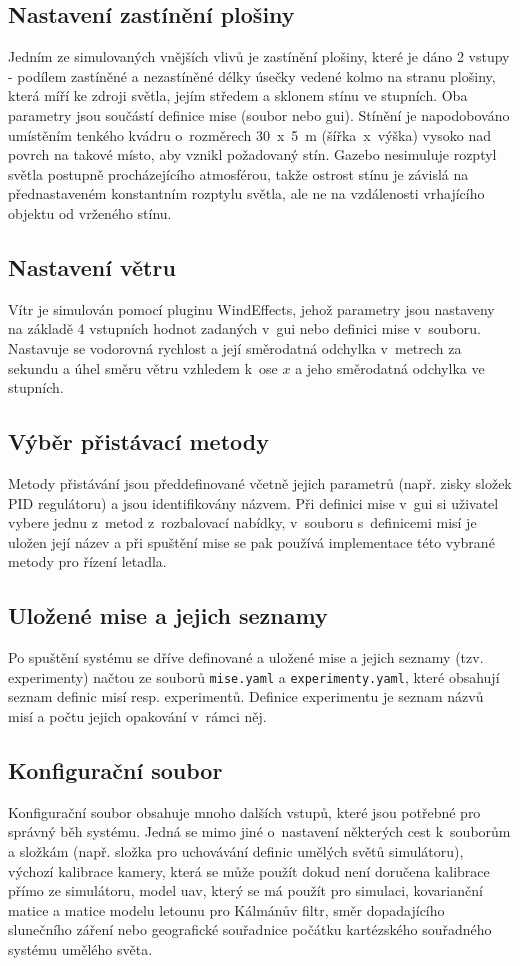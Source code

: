     \subsection{Nastavení zastínění plošiny}
      Jedním ze simulovaných vnějších vlivů je zastínění plošiny, které je dáno 2 vstupy - podílem zastíněné a nezastíněné délky úsečky vedené kolmo na stranu plošiny, která míří ke zdroji světla, jejím středem a sklonem stínu ve stupních. Oba parametry jsou součástí definice mise (soubor nebo \acrshort{gui}). Stínění je napodobováno umístěním tenkého kvádru o~rozměrech 30~x~5~m (šířka~x~výška) vysoko nad povrch na takové místo, aby vznikl požadovaný stín. Gazebo nesimuluje rozptyl světla postupně procházejícího atmosférou, takže ostrost stínu je závislá na přednastaveném konstantním rozptylu světla, ale ne na vzdálenosti vrhajícího objektu od vrženého stínu.
    \subsection{Nastavení větru}
      Vítr je simulován pomocí pluginu WindEffects, jehož parametry jsou nastaveny na základě 4 vstupních hodnot zadaných v~\acrshort{gui} nebo definici mise v~souboru. Nastavuje se vodorovná rychlost a její směrodatná odchylka v~metrech za sekundu a úhel směru větru vzhledem k~ose $x$ a jeho směrodatná odchylka ve stupních.
    \subsection{Výběr přistávací metody}
      Metody přistávání jsou předdefinované včetně jejich parametrů (např. zisky složek PID regulátoru) a jsou identifikovány názvem. Při definici mise v~\acrshort{gui} si uživatel vybere jednu z~metod z~rozbalovací nabídky, v~souboru s~definicemi misí je uložen její název a při spuštění mise se pak používá implementace této vybrané metody pro řízení letadla.
    \subsection{Uložené mise a jejich seznamy} \label{sec:saved}
      Po spuštění systému se dříve definované a uložené mise a jejich seznamy (tzv. experimenty) načtou ze souborů \texttt{mise.yaml} a \texttt{experimenty.yaml}, které obsahují seznam definic misí resp. experimentů. Definice experimentu je seznam názvů misí a počtu jejich opakování v~rámci něj.
    \subsection{Konfigurační soubor}
      Konfigurační soubor obsahuje mnoho dalších vstupů, které jsou potřebné pro správný běh systému. Jedná se mimo jiné o~nastavení některých cest k~souborům a složkám (např. složka pro uchovávání definic umělých světů simulátoru), výchozí kalibrace kamery, která se může použít dokud není doručena kalibrace přímo ze simulátoru, model \acrshort{uav}, který se má použít pro simulaci, kovarianční matice a matice modelu letounu pro Kálmánův filtr, směr dopadajícího slunečního záření nebo geografické souřadnice počátku kartézského souřadného systému umělého světa.
